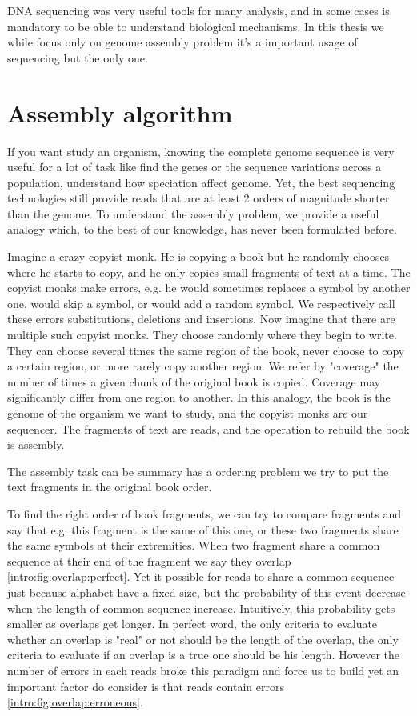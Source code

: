 \documentclass[./main.tex]{subfiles}
\begin{document}
DNA sequencing was very useful tools for many analysis, and in some cases is mandatory to be able to understand biological mechanisms. In this thesis we while focus only on genome assembly problem it's a important usage of sequencing but the only one.

\section{Assembly algorithm}

If you want study an organism, knowing the complete genome sequence is very useful for a lot of task like find the genes or the sequence variations across a population, understand how speciation affect genome. Yet, the best sequencing technologies still provide reads that are at least 2 orders of magnitude shorter than the genome. To understand the assembly problem, we provide a useful analogy which, to the best of our knowledge, has never been formulated before.

Imagine a crazy copyist monk. He is copying a book but he randomly chooses where he starts to copy, and he only copies small fragments of text at a time.
The copyist monks make errors, e.g. he would sometimes replaces a symbol by another one, would skip a symbol, or would add a random symbol. We respectively call these errors substitutions, deletions and insertions.
Now imagine that there are multiple such copyist monks.
They choose randomly where they begin to write. They can choose several times the same region of the book, never choose to copy a certain region, or more rarely copy another region. We refer by "coverage" the number of times a given chunk of the original book is copied. Coverage may significantly differ from one region to another.
In this analogy, the book is the genome of the organism we want to study, and the copyist monks are our sequencer. The fragments of text are reads, and the operation to rebuild the book is assembly.

The assembly task can be summary has a ordering problem we try to put the text fragments in the original book order.

To find the right order of book fragments, we can try to compare fragments and say that e.g. this fragment is the same of this one, or these two fragments share the same symbols at their extremities. When two fragment share a common sequence at their end of the fragment we say they overlap \ref{intro:fig:overlap:perfect}. Yet it possible for reads to share a common sequence just because alphabet have a fixed size, but the probability of this event decrease when the length of common sequence increase. Intuitively, this probability gets smaller as overlaps get longer. In perfect word, the only criteria to evaluate whether an overlap is "real" or not should be the length of the overlap, the only criteria to evaluate if an overlap is a true one should be his length. However the number of errors in each reads broke this paradigm and force us to build  yet an important factor do consider is that reads contain errors \ref{intro:fig:overlap:erroneous}.
\end{document}
